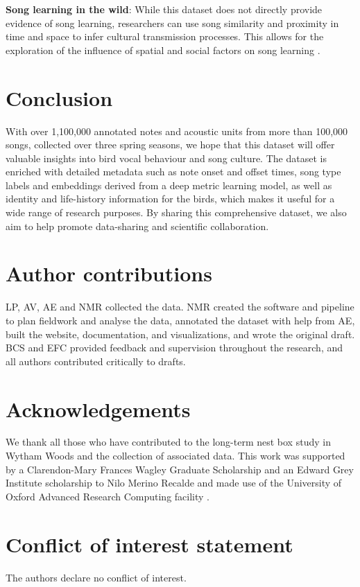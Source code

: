 \textbf{Song learning in the wild}: While this dataset does not directly provide evidence of song learning, researchers can use song similarity and proximity in time and space to infer cultural transmission processes. This allows for the exploration of the influence of spatial and social factors on song learning \parencite{james2020, lachlan2003, nelson2014, peters2017, wheelwright2008}.


\section{Conclusion}

With over 1,100,000 annotated notes and acoustic units from more than 100,000 songs, collected over three spring seasons, we hope that this dataset will offer valuable insights into bird vocal behaviour and song culture. The dataset is enriched with detailed metadata such as note onset and offset times, song type labels and embeddings derived from a deep metric learning model, as well as identity and life-history information for the birds, which makes it useful for a wide range of research purposes. By sharing this comprehensive dataset, we also aim to help promote data-sharing and scientific collaboration.

\section{Author contributions}

LP, AV, AE and NMR collected the data. NMR created the software and pipeline to plan fieldwork and analyse the data, annotated the dataset with help from AE, built the website, documentation, and visualizations, and wrote the original draft. BCS and EFC provided feedback and supervision throughout the research, and all authors contributed critically to drafts.

\section{Acknowledgements}
We thank all those who have contributed to the long-term nest box study in Wytham Woods and the collection of associated data.
This work was supported by a Clarendon-Mary Frances Wagley Graduate Scholarship
and an Edward Grey Institute scholarship to Nilo Merino Recalde and made use of the University of Oxford Advanced Research Computing facility \parencite{richards2015}.

\section{Conflict of interest statement}
The authors declare no conflict of interest.

